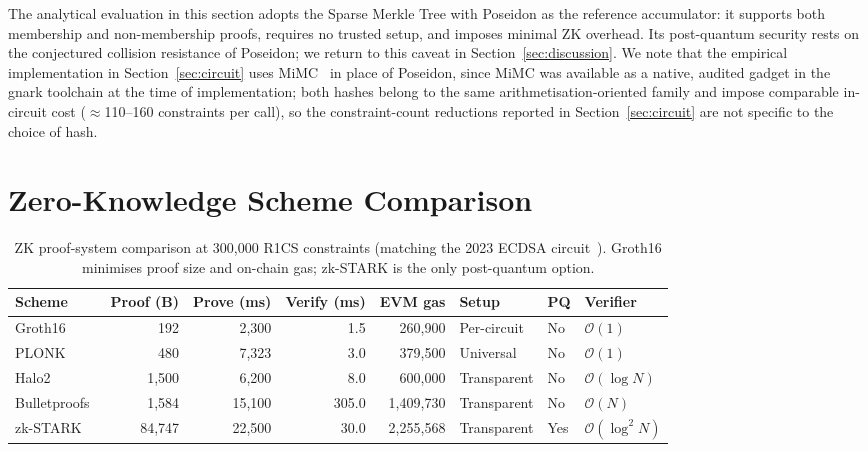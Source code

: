 \documentclass[conference]{IEEEtran}
\begin{document}
The analytical evaluation in this section adopts the Sparse Merkle
Tree with Poseidon as the reference accumulator: it supports both
membership and non-membership proofs, requires no trusted setup, and
imposes minimal ZK overhead.
Its post-quantum security rests on the conjectured collision resistance
of Poseidon; we return to this caveat in Section~\ref{sec:discussion}.
We note that the empirical implementation in
Section~\ref{sec:circuit} uses MiMC~\cite{MiMC} in place of Poseidon,
since MiMC was available as a native, audited gadget in the gnark
toolchain at the time of implementation; both hashes belong to the
same arithmetisation-oriented family and impose comparable in-circuit
cost ($\approx$110--160 constraints per call), so the constraint-count
reductions reported in Section~\ref{sec:circuit} are not specific to
the choice of hash.

\section{Zero-Knowledge Scheme Comparison}
\label{sec:zkschemes}

\begin{table}[t]
\caption{ZK proof-system comparison at 300{,}000 R1CS constraints
(matching the 2023 ECDSA circuit~\cite{Kravchenko2023}).
Groth16 minimises proof size and on-chain gas; zk-STARK is the only
post-quantum option.}
\label{tab:zkschemes}
\centering
\begin{tabular}{lrrrrlll}
\toprule
\textbf{Scheme} & \textbf{Proof (B)} & \textbf{Prove (ms)}
  & \textbf{Verify (ms)} & \textbf{EVM gas} & \textbf{Setup} & \textbf{PQ} & \textbf{Verifier} \\
\midrule
Groth16~\cite{Groth16}          &     192 &  2,300 &   1.5 &   260,900 & Per-circuit & No  & $\mathcal{O}(1)$ \\
PLONK~\cite{PLONK}              &     480 &  7,323 &   3.0 &   379,500 & Universal   & No  & $\mathcal{O}(1)$ \\
Halo2~\cite{Halo2}              &   1,500 &  6,200 &   8.0 &   600,000 & Transparent & No  & $\mathcal{O}(\log N)$ \\
Bulletproofs~\cite{Bulletproofs}&   1,584 & 15,100 & 305.0 & 1,409,730 & Transparent & No  & $\mathcal{O}(N)$ \\
zk-STARK~\cite{STARKs}          &  84,747 & 22,500 &  30.0 & 2,255,568 & Transparent & Yes & $\mathcal{O}(\log^2 N)$ \\
\bottomrule
\end{tabular}
\end{table}
\end{document}
